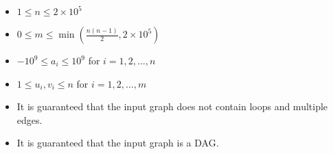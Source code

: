 \begin{itemize}
\tightlist
\item $1 \leq n \leq 2 \times 10 ^ 5$
\item $0 \leq m \leq \min(\frac{n(n - 1)}{2}, 2 \times 10^5)$
\item $-10^9 \leq a_i \leq 10^9$ for $i = 1, 2, \ldots, n$
\item $1 \leq u_i, v_i \leq n$ for $i = 1, 2, \ldots, m$
\item It is guaranteed that the input graph does not contain loops and multiple edges.
\item It is guaranteed that the input graph is a DAG.
\end{itemize}
